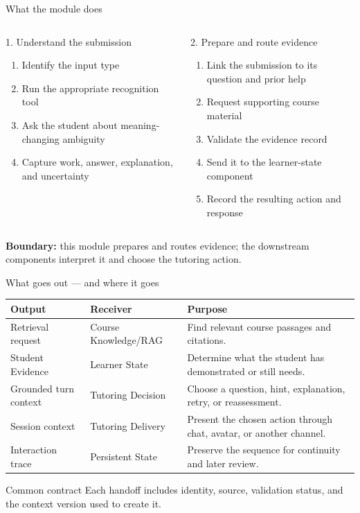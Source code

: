 \documentclass[aspectratio=169,10pt]{beamer}
\begin{document}
\begin{frame}{What the module does}
\begin{columns}[T,onlytextwidth]
\begin{block}{1. Understand the submission}
\begin{enumerate}
\item Identify the input type
\item Run the appropriate recognition tool
\item Ask the student about meaning-changing ambiguity
\item Capture work, answer, explanation, and uncertainty
\end{enumerate}
\end{block}
\begin{block}{2. Prepare and route evidence}
\begin{enumerate}
\item Link the submission to its question and prior help
\item Request supporting course material
\item Validate the evidence record
\item Send it to the learner-state component
\item Record the resulting action and response
\end{enumerate}
\end{block}
\end{columns}
\vspace{.4em}
\centering
\textbf{Boundary:} this module prepares and routes evidence; the downstream components interpret it and choose the tutoring action.
\end{frame}

\begin{frame}{What goes out --- and where it goes}
\small
\begin{tabularx}{\textwidth}{@{}p{}p{}X@{}}
\toprule
\textbf{Output} & \textbf{Receiver} & \textbf{Purpose} \\
\midrule
Retrieval request & Course Knowledge/RAG & Find relevant course passages and citations. \\
\addlinespace
Student Evidence & Learner State & Determine what the student has demonstrated or still needs. \\
\addlinespace
Grounded turn context & Tutoring Decision & Choose a question, hint, explanation, retry, or reassessment. \\
\addlinespace
Session context & Tutoring Delivery & Present the chosen action through chat, avatar, or another channel. \\
\addlinespace
Interaction trace & Persistent State & Preserve the sequence for continuity and later review. \\
\bottomrule
\end{tabularx}
\vspace{.45em}
\begin{block}{Common contract}
Each handoff includes identity, source, validation status, and the context version used to create it.
\end{block}
\end{frame}
\end{document}

